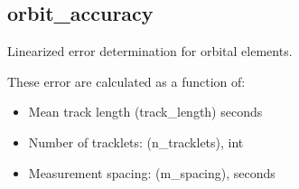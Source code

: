 \documentclass[letterpaper,10pt,english]{sphinxmanual}
\begin{document}
\subsection{orbit\_accuracy}
\label{\detokenize{modules/orbit_accuracy:module-orbit_accuracy}}\label{\detokenize{modules/orbit_accuracy:orbit-accuracy}}\label{\detokenize{modules/orbit_accuracy::doc}}
Linearized error determination for orbital elements.

These error are calculated as a function of:
\begin{itemize}
\item {} 
Mean track length (track\_length) seconds

\item {} 
Number of tracklets: (n\_tracklets), int

\item {} 
Measurement spacing: (m\_spacing), seconds

\end{itemize}

\begin{fulllineitems}
\label{\detokenize{modules/orbit_accuracy:orbit_accuracy.create_measurements}}
\end{fulllineitems}


\begin{fulllineitems}
\label{\detokenize{modules/orbit_accuracy:orbit_accuracy.error_sweep}}
\end{fulllineitems}


\begin{fulllineitems}
\label{\detokenize{modules/orbit_accuracy:orbit_accuracy.error_sweep_n}}
\end{fulllineitems}
\end{document}
